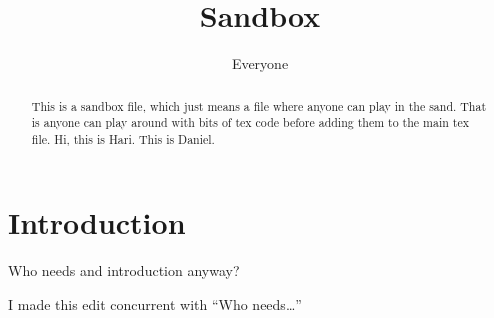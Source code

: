 \documentclass{article}
\title{Sandbox}
\author{Everyone}
\begin{document}
\maketitle

\begin{abstract}
    This is a sandbox file, which just means a file where anyone can
    play in the sand. That is anyone can play around with bits of tex
    code before adding them to the main tex file. Hi, this is
    Hari. This is Daniel.
\end{abstract}

\section{Introduction}

Who needs and introduction anyway?

I made this edit concurrent with ``Who needs\ldots''
\end{document}
